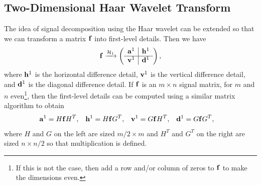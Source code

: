 \documentclass[12pt]{article}
\theoremstyle{definition}
\begin{document}
  \subsection{Two-Dimensional Haar Wavelet Transform}
  The idea of signal decomposition using the Haar wavelet can be extended so that we can transform a matrix \(\vb{f}\) into first-level details. Then we have
  \begin{equation} \label{eqn:2d-wave-dec}
    \vb{f} \xrightarrow{\mathcal{H}_1}
    \left(\begin{array}{c|c}
      \vb{a}^1 & \vb{h}^1\\ \hline
      \vb{v}^1 & \vb{d}^1
    \end{array}\right),
  \end{equation}
  where \(\vb{h}^1\) is the horizontal difference detail, \(\vb{v}^1\) is the vertical difference detail, and \(\vb{d}^1\) is the diagonal difference detail. If \(\vb{f}\) is an \(m \times n\) signal matrix, for \(m\) and \(n\) even\footnote{If this is not the case, then add a row and/or column of zeros to \(\vb{f}\) to make the dimensions even.}, then the first-level details can be computed using a similar matrix algorithm to obtain
  \begin{align} \label{eqn:matrix-decomp}
      \vb{a}^1 &= H \vb{f} H^T, &
      \vb{h}^1 &= H \vb{f} G^T, &
      \vb{v}^1 &= G \vb{f} H^T, &
      \vb{d}^1 &= G \vb{f} G^T,
  \end{align}
  where \(H\) and \(G\) on the left are sized \(m/2 \times m\) and \(H^T\) and \(G^T\) on the right are sized \(n \times n/2\) so that multiplication is defined.
  
\end{document}
